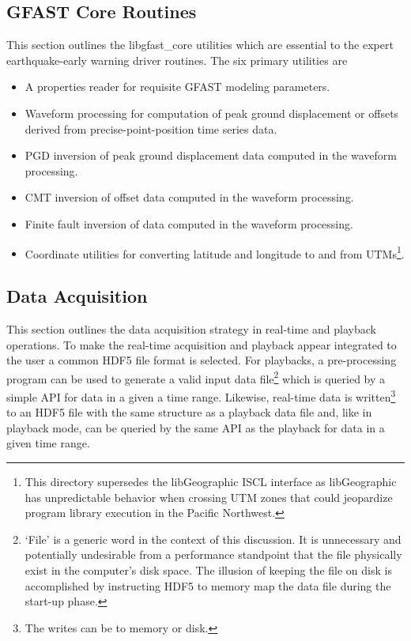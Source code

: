 \documentclass[12pt]{article}
\begin{document}
\subsection{GFAST Core Routines}\label{ss:gfastCore}
This section outlines the libgfast\_core utilities which are essential to the expert
earthquake-early warning driver routines.  The six primary utilities are
\begin{itemize}
  \item A properties reader for requisite GFAST modeling parameters.
  \item Waveform processing for computation of peak ground displacement or offsets
  derived from precise-point-position time series data.
  \item PGD inversion of peak ground displacement data computed in the waveform processing.
  \item CMT inversion of offset data computed in the waveform processing.
  \item Finite fault inversion of data computed in the waveform processing.
  \item Coordinate utilities for converting latitude and longitude to and from 
  UTMs\footnote{This directory supersedes the libGeographic ISCL interface as libGeographic 
            has unpredictable behavior when crossing UTM zones that could jeopardize
            program library execution in the Pacific Northwest.}.  
\end{itemize}

\clearpage
\subsection{Data Acquisition}
This section outlines the data acquisition strategy in real-time and playback operations.
To make the real-time acquisition and playback appear integrated to the user a common
HDF5 file format is selected.  For playbacks, a pre-processing program can be used to generate 
a valid input data 
file\footnote{`File' is a generic word in the context of this discussion.  
It is unnecessary and potentially undesirable from a performance standpoint that
the file physically exist in the computer's disk space.  The illusion of keeping 
the file on disk is accomplished by instructing HDF5 to memory map the data 
file during the start-up phase.}
which is queried by a simple API for data in a given a time range.  
Likewise, real-time data is  
written\footnote{The writes can be to memory or disk.}
to an HDF5 file with the same structure as a playback data file and, like in playback mode,
can be queried by the same API as the playback for data in a given time range.
\end{document}
